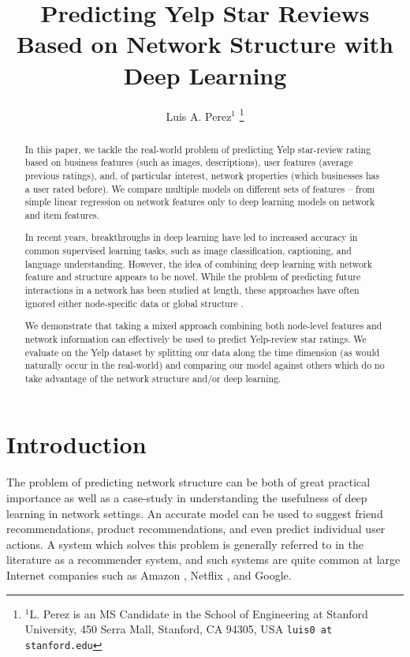 \documentclass[letterpaper, 10 pt, conference]{ieeeconf}  %
\title{\LARGE \bf
Predicting Yelp Star Reviews Based on Network Structure with Deep Learning}
\author{Luis A. Perez$^{1}$%
\thanks{$^{1}$L. Perez is an MS Candidate in the School of Engineering at Stanford University,
        450 Serra Mall, Stanford, CA 94305, USA
        {\tt\small luis0 at stanford.edu}}%
}
\begin{document}
\maketitle
\thispagestyle{empty}
\pagestyle{empty}


\begin{abstract}

In this paper, we tackle the real-world problem of predicting Yelp star-review rating based on business features (such as images, descriptions), user features (average previous ratings), and, of particular interest, network properties (which businesses has a user rated before). We compare multiple models on different sets of features -- from simple linear regression on network features only to deep learning models on network and item features.

In recent years, breakthroughs in deep learning have led to increased accuracy in common supervised learning tasks, such as image classification, captioning, and language understanding. However, the idea of combining deep learning with network feature and structure appears to be novel. While the problem of predicting future interactions in a network has been studied at length, these approaches have often ignored either node-specific data or global structure \cite{PintrestProject}.

We demonstrate that taking a mixed approach combining both node-level features and network information can effectively be used to predict Yelp-review star ratings. We evaluate on the Yelp dataset by splitting our data along the time dimension (as would naturally occur in the real-world) and comparing our model against others which do no take advantage of the network structure and/or deep learning.

\end{abstract}


\section{Introduction}
The problem of predicting network structure can be both of great practical importance as well as a case-study in understanding the usefulness of deep learning in network settings. An accurate model can be used to suggest friend recommendations, product recommendations, and even predict individual user actions. A system which solves this problem is generally referred to in the literature as a recommender system, and such systems are quite common at large Internet companies such as Amazon \cite{Linden:2003:ARI:642462.642471}, Netflix \cite{Zhou:2008:LPC:1424237.1424269}, and Google.
\end{document}
